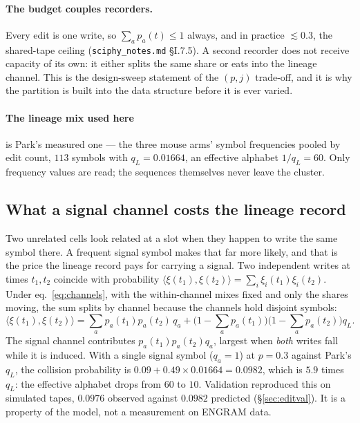 \paragraph{The budget couples recorders.} Every edit is one write, so $\sum_a p_a(t)\le1$ always, and
in practice $\lesssim0.3$, the shared-tape ceiling (\texttt{sciphy\_notes.md} \S I.7.5). A second
recorder does not receive capacity of its own: it either splits the same share or eats into the lineage
channel. This is the design-sweep statement of the $(p,j)$ trade-off, and it is why the partition is
built into the data structure before it is ever varied.

\paragraph{The lineage mix used here} is Park's measured one --- the three mouse arms' symbol
frequencies pooled by edit count, $113$ symbols with $q_L=0.01664$, an effective alphabet
$1/q_L=60$. Only frequency values are read; the sequences themselves never leave the cluster.

\subsection{What a signal channel costs the lineage record}\label{sec:collision}

Two unrelated cells look related at a slot when they happen to write the same symbol there. A frequent
signal symbol makes that far more likely, and that is the price the lineage record pays for carrying a
signal. Two independent writes at times $t_1,t_2$ coincide with probability
$\langle\xi(t_1),\xi(t_2)\rangle=\sum_i\xi_i(t_1)\xi_i(t_2)$. Under eq.~\eqref{eq:channels}, with the
within-channel mixes fixed and only the shares moving, the sum splits by channel because the channels
hold disjoint symbols:
\begin{equation}
  \langle\xi(t_1),\xi(t_2)\rangle
  =\sum_a p_a(t_1)p_a(t_2)\,q_a
  +\Big(1-\sum_a p_a(t_1)\Big)\Big(1-\sum_a p_a(t_2)\Big)q_L .
  \label{eq:collision}
\end{equation}
The signal channel contributes $p_a(t_1)p_a(t_2)q_a$, largest when \emph{both} writes fall while it is
induced. With a single signal symbol ($q_a=1$) at $p=0.3$ against Park's $q_L$, the collision
probability is $0.09+0.49\times0.01664=0.0982$, which is $5.9$ times $q_L$: the effective alphabet drops
from $60$ to $10$. Validation reproduced this on simulated tapes, $0.0976$ observed against $0.0982$
predicted (\S\ref{sec:editval}). It is a property of the model, not a measurement on ENGRAM data.

